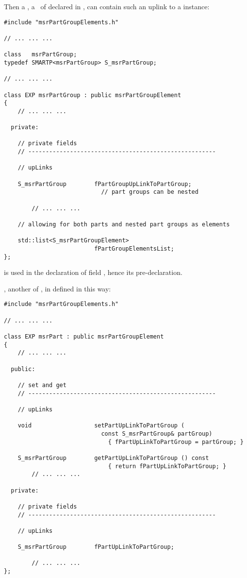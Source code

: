 Then a , a \subClass\ of  declared in , can contain such an uplink to a  instance:
\begin{lstlisting}[language=CPlusPlus]
#include "msrPartGroupElements.h"

// ... ... ...

class   msrPartGroup;
typedef SMARTP<msrPartGroup> S_msrPartGroup;

// ... ... ...

class EXP msrPartGroup : public msrPartGroupElement
{
	// ... ... ...

  private:

    // private fields
    // ------------------------------------------------------

    // upLinks

    S_msrPartGroup        fPartGroupUpLinkToPartGroup;
                            // part groups can be nested

		// ... ... ...

    // allowing for both parts and nested part groups as elements

    std::list<S_msrPartGroupElement>
                          fPartGroupElementsList;
};
\end{lstlisting}

 is used in the declaration of field , hence its pre-declaration.

, another \subClass of , in defined in  this way:
\begin{lstlisting}[language=CPlusPlus]
#include "msrPartGroupElements.h"

// ... ... ...

class EXP msrPart : public msrPartGroupElement
{
	// ... ... ...

  public:

    // set and get
    // ------------------------------------------------------

    // upLinks

    void                  setPartUpLinkToPartGroup (
                            const S_msrPartGroup& partGroup)
                              { fPartUpLinkToPartGroup = partGroup; }

    S_msrPartGroup        getPartUpLinkToPartGroup () const
                              { return fPartUpLinkToPartGroup; }
		// ... ... ...

  private:

    // private fields
    // ------------------------------------------------------

    // upLinks

    S_msrPartGroup        fPartUpLinkToPartGroup;

		// ... ... ...
};
\end{lstlisting}

